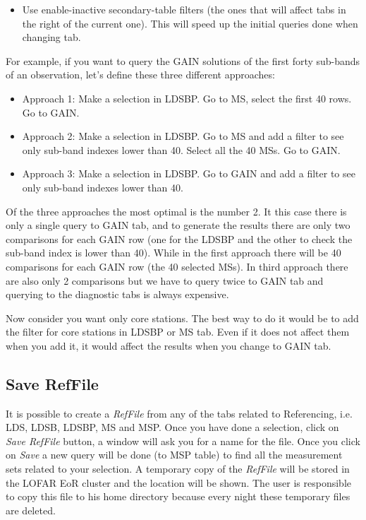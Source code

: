 \documentclass[a4paper,11pt]{article}
\begin{document}
\begin{itemize}
\begin{itemize}
		\item Use enable-inactive secondary-table filters (the ones that will affect tabs in the right of the current one). This will speed up the initial queries done when changing tab.
	\end{itemize}
	
	For example, if you want to query the GAIN solutions of the first forty sub-bands of an observation, let's define these three different approaches:
	\begin{itemize}
		\item Approach 1: Make a selection in LDSBP. Go to MS, select the first 40 rows. Go to GAIN.
	
		\item Approach 2: Make a selection in LDSBP. Go to MS and add a filter to see only sub-band indexes lower than 40. Select all the 40 MSs. Go to GAIN.
		
		\item Approach 3: Make a selection in LDSBP. Go to GAIN and add a filter to see only sub-band indexes lower than 40.
	\end{itemize}
	
	Of the three approaches the most optimal is the number 2. It this case there is only a single query to GAIN tab, and to generate the results there are only two comparisons for each GAIN row (one for the LDSBP and the other to check the sub-band index is lower than 40).  While in the first approach there will be 40 comparisons for each GAIN row (the 40 selected MSs). In third approach there are also only 2 comparisons but we have to query twice to GAIN tab and querying to the diagnostic tabs is always expensive.
	
	Now consider you want only core stations. The best way to do it would be to add the filter for core stations in LDSBP or MS tab. Even if it does not affect them when you add it, it would affect the results when you change to GAIN tab.
\end{itemize}


\subsection{Save RefFile}
\label{sec:createref}
It is possible to create a \textit{RefFile} from any of the tabs related to Referencing, i.e. LDS, LDSB, LDSBP, MS and MSP. Once you have done a selection, click on \textit{Save RefFile} button, a window will ask you for a name for the file. Once you click on \textit{Save} a new query will be done (to MSP table) to find all the measurement sets related to your selection. A temporary copy of the \textit{RefFile} will be stored in the LOFAR EoR cluster and the location will be shown. The user is responsible to copy this file to his home directory because every night these temporary files are deleted.
\end{document}
